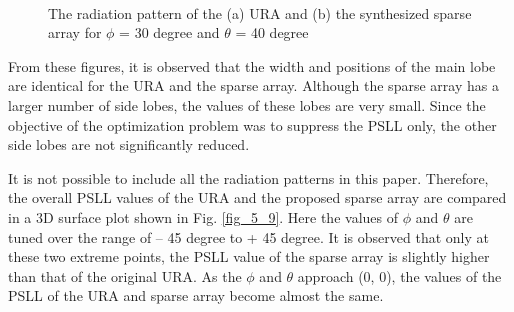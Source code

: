 \begin{figure}
  \centering
   ~~~~
  \\
  \caption{The radiation pattern of the (a) URA and (b) the synthesized sparse array for $\phi$ = 30 degree and $\theta$ = 40 degree} \label{fig_5_8}
\end{figure}

From these figures, it is observed that the width and positions of the main lobe are identical for the URA and the sparse array. Although the sparse array has a larger number of side lobes, the values of these lobes are very small. Since the objective of the optimization problem was to suppress the PSLL only, the other side lobes are not significantly reduced.

It is not possible to include all the radiation patterns in this paper. Therefore, the overall PSLL values of the URA and the proposed sparse array are compared in a 3D surface plot shown in Fig. \ref{fig_5_9}. Here the values of $\phi$ and $\theta$ are tuned over the range of -- 45 degree to + 45 degree. It is observed that only at these two extreme points, the PSLL value of the sparse array is slightly higher than that of the original URA. As the $\phi$ and $\theta$ approach (0, 0), the values of the PSLL of the URA and sparse array become almost the same.

